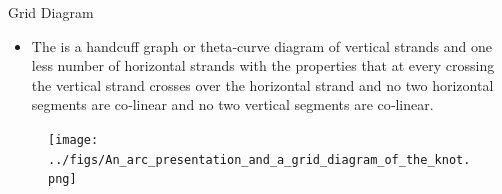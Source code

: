 \begin{frame}{Grid Diagram}
	\begin{itemize}
		\item The  is a handcuff graph or theta‐curve diagram of vertical strands and one less number of horizontal strands with the properties that at every crossing the vertical strand crosses over the horizontal strand and no two horizontal segments are co‐linear and no two vertical segments are co‐linear.
	\end{itemize}
\begin{figure}
    \centerline{\texttt{[image: ../figs/An\_arc\_presentation\_and\_a\_grid\_diagram\_of\_the\_knot.png]}}
\end{figure}
\end{frame}




